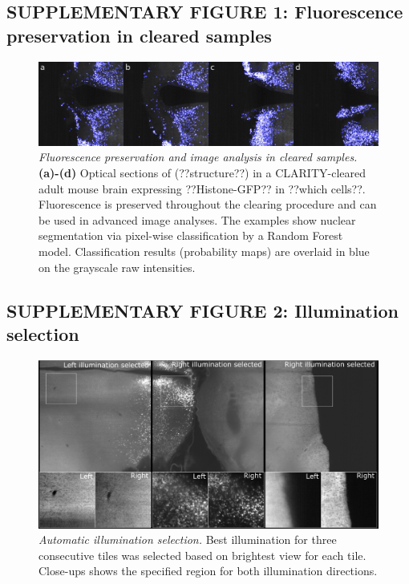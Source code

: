 \documentclass[]{spie}  %
\begin{document}
\subsection*{SUPPLEMENTARY FIGURE 1: Fluorescence preservation in cleared samples}
\vspace{1mm}
\begin{figure}[h!]
\includegraphics[width=\textwidth]{fig-rf.png}
\vspace{-2.0mm}
\caption{\hspace{-0.5mm} \emph{Fluorescence preservation and image analysis in cleared samples.} \textbf{(a)-(d)} Optical sections of (??structure??) in a CLARITY-cleared adult mouse brain expressing ??Histone-GFP?? in ??which cells??. Fluorescence is preserved throughout the clearing procedure and can be used in advanced image analyses. The examples show nuclear segmentation via pixel-wise classification by a Random Forest \cite{arganda2017trainable} model. Classification results (probability maps) are overlaid in blue on the grayscale raw intensities.
}
\label{fig:sup-fig-rf}
\end{figure}

\pagebreak


\subsection*{SUPPLEMENTARY FIGURE 2: Illumination selection}
\vspace{1mm}
\begin{figure}[h!]
\includegraphics[width=\textwidth]{Illu_Select.png}
\vspace{-2.0mm}
\caption{\hspace{-0.5mm} \emph{Automatic illumination selection.} Best illumination for three consecutive tiles was selected based on brightest view for each tile. Close-ups shows the specified region for both illumination directions.
}
\label{fig:sup-fig-illu-select}
\end{figure}
\end{document}
